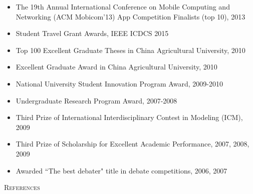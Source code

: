 \documentclass[letter]{article}
\newenvironment{tightitem}
{\begin{itemize}
\setlength{\itemsep}{1pt}
\setlength{\parskip}{0pt}
\setlength{\parsep}{0pt}}
{\end{itemize}}
\newcommand{\heading}[1]{\item \large \textsc{#1} \normalsize}
\begin{document}
\begin{description}
\begin{tightitem}
\item The 19th Annual International Conference on Mobile Computing and Networking (ACM Mobicom'13) App Competition Finalists (top 10), 2013
\item Student Travel Grant Awards, IEEE ICDCS 2015
\item Top 100 Excellent Graduate Theses in China Agricultural University, 2010
\item  Excellent Graduate Award in China Agricultural University, 2010
\item   National University Student Innovation Program Award, 2009-2010
\item  Undergraduate Research Program Award, 2007-2008
\item Third Prize of International Interdisciplinary Contest in Modeling (ICM), 2009
\item  Third Prize of Scholarship for Excellent Academic Performance, 2007, 2008, 2009
\item Awarded ``The best debater"  title in debate competitions, 2006, 2007
\end{tightitem}
\heading{References}\\



\end{description}
\end{document}
